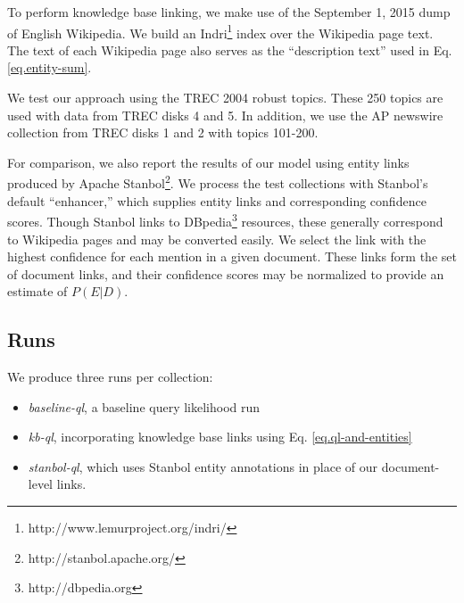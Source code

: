 \documentclass{sig-alternate}
\begin{document}
To perform knowledge base linking, we make use of the September 1, 2015 dump of English Wikipedia. We build an Indri\footnote{http://www.lemurproject.org/indri/} index over the Wikipedia page text. The text of each Wikipedia page also serves as the ``description text'' used in Eq. \ref{eq.entity-sum}.

We test our approach using the TREC 2004 robust topics. These 250 topics are used with data from TREC disks 4 and 5. In addition, we use the AP newswire collection from TREC disks 1 and 2 with topics 101-200.

For comparison, we also report the results of our model using entity links produced by Apache Stanbol\footnote{http://stanbol.apache.org/}. We process the test collections with Stanbol's default ``enhancer,'' which supplies entity links and corresponding confidence scores. Though Stanbol links to DBpedia\footnote{http://dbpedia.org} resources, these generally correspond to Wikipedia pages and may be converted easily. We select the link with the highest confidence for each mention in a given document. These links form the set of document links, and their confidence scores may be normalized to provide an estimate of $P(E|D)$.

\subsection{Runs}\label{section.evaluation.runs}


We produce three runs per collection:
\begin{itemize}
	\item \textit{baseline-ql}, a baseline query likelihood run
	\item \textit{kb-ql}, incorporating knowledge base links using Eq. \ref{eq.ql-and-entities}
	\item \textit{stanbol-ql}, which uses Stanbol entity annotations in place of our document-level links.
\end{itemize}
\end{document}
